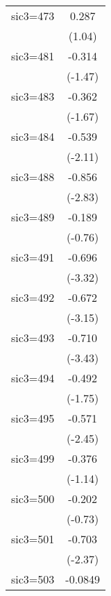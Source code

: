 \begin{table}[htbp]
\begin{tabular*}{0.8\hsize}{@{\hskip\tabcolsep\extracolsep\fill}l*{1}{c}}
\addlinespace
sic3=473            &       0.287         \\
                    &      (1.04)         \\
\addlinespace
sic3=481            &      -0.314         \\
                    &     (-1.47)         \\
\addlinespace
sic3=483            &      -0.362         \\
                    &     (-1.67)         \\
\addlinespace
sic3=484            &      -0.539\sym{*}  \\
                    &     (-2.11)         \\
\addlinespace
sic3=488            &      -0.856\sym{**} \\
                    &     (-2.83)         \\
\addlinespace
sic3=489            &      -0.189         \\
                    &     (-0.76)         \\
\addlinespace
sic3=491            &      -0.696\sym{***}\\
                    &     (-3.32)         \\
\addlinespace
sic3=492            &      -0.672\sym{**} \\
                    &     (-3.15)         \\
\addlinespace
sic3=493            &      -0.710\sym{***}\\
                    &     (-3.43)         \\
\addlinespace
sic3=494            &      -0.492         \\
                    &     (-1.75)         \\
\addlinespace
sic3=495            &      -0.571\sym{*}  \\
                    &     (-2.45)         \\
\addlinespace
sic3=499            &      -0.376         \\
                    &     (-1.14)         \\
\addlinespace
sic3=500            &      -0.202         \\
                    &     (-0.73)         \\
\addlinespace
sic3=501            &      -0.703\sym{*}  \\
                    &     (-2.37)         \\
\addlinespace
sic3=503            &     -0.0849         \\

\end{tabular*}
\end{table}
